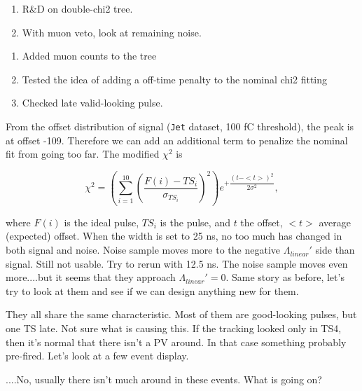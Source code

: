 

\begin{enumerate}
\item R\&D on double-chi2 tree.
\item With muon veto, look at remaining noise.
\end{enumerate}


\begin{enumerate}
\item Added muon counts to the tree
\item Tested the idea of adding a off-time penalty to the nominal chi2 fitting
\item Checked late valid-looking pulse.
\end{enumerate}



From the offset distribution of signal (\texttt{Jet} dataset, 100 fC threshold), the peak is at offset -109.
Therefore we can add an additional term to penalize the nominal fit from going too far.  The modified $\chi^2$ is

\begin{equation}
\chi^2 = \left(\sum_{i=1}^{10} \left(\dfrac{F(i) - TS_i}{\sigma_{TS_i}}\right)^2 \right)
   e^{+\dfrac{(t-<t>)^2}{2 \sigma^2}},
\nonumber
\end{equation}

where $F(i)$ is the ideal pulse, $TS_i$ is the pulse, and $t$ the offset, $<t>$ average (expected) offset.
When the width is set to 25 ns, no too much has changed in both signal and noise.  Noise sample
moves more to the negative $\Lambda_{linear}'$ side than signal.
Still not usable.
Try to rerun with 12.5 ns.  The noise sample moves even more....but it seems that they approach $\Lambda_{linear}' = 0$.
Same story as before, let's try to look at them and see if we can design anything new for them.


They all share the same characteristic.  Most of them are good-looking pulses, but one TS late.
Not sure what is causing this.  If the tracking looked only in TS4, then it's normal that there isn't a PV around.
In that case something probably pre-fired.  Let's look at a few event display.

....No, usually there isn't much around in these events.  What is going on?


